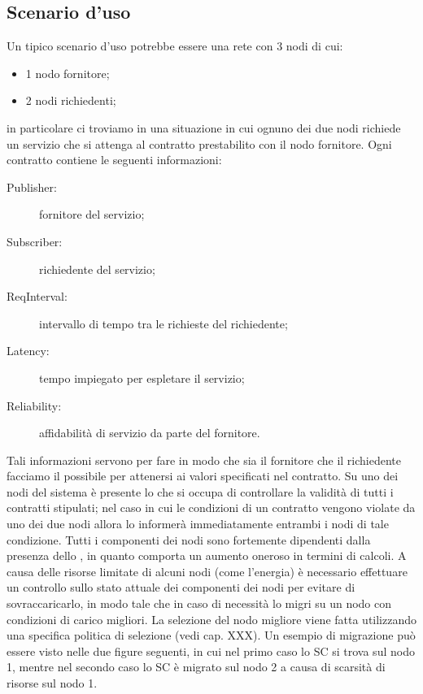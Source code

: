 \subsection{Scenario d'uso}
Un tipico scenario d'uso potrebbe essere una rete con 3 nodi di cui:
\begin{itemize}
\item 1 nodo fornitore;
\item 2 nodi richiedenti;
\end{itemize}
in particolare ci troviamo in una situazione in cui ognuno dei due nodi richiede un servizio che si attenga al contratto prestabilito con il nodo fornitore. Ogni contratto contiene le seguenti informazioni:
\begin{description}
\item[Publisher:] fornitore del servizio;
\item[Subscriber:] richiedente del servizio;
\item[ReqInterval:] intervallo di tempo tra le richieste del richiedente;
\item[Latency:] tempo impiegato per espletare il servizio;
\item[Reliability:] affidabilità di servizio da parte del fornitore.
\end{description}
Tali informazioni servono per fare in modo che sia il fornitore che il richiedente facciamo il possibile per attenersi ai valori specificati nel contratto.
Su uno dei nodi del sistema è presente lo  che si occupa di controllare la validità di tutti i contratti stipulati; nel caso in cui le condizioni di un contratto vengono violate da uno dei due nodi allora lo  informerà immediatamente entrambi i nodi di tale condizione. Tutti i componenti dei nodi sono fortemente dipendenti dalla presenza dello , in quanto comporta un aumento oneroso in termini di calcoli. A causa delle risorse limitate di alcuni nodi (come l'energia) è necessario effettuare un controllo sullo stato attuale dei componenti dei nodi per evitare di sovraccaricarlo, in modo tale che in caso di necessità lo  migri su un nodo con condizioni di carico migliori. La selezione del nodo migliore viene fatta utilizzando una specifica politica di selezione (vedi cap. XXX). Un esempio di migrazione può essere visto nelle due figure seguenti, in cui nel primo caso lo SC si trova sul nodo 1, mentre nel secondo caso lo SC è migrato sul nodo 2 a causa di scarsità di risorse sul nodo 1.
